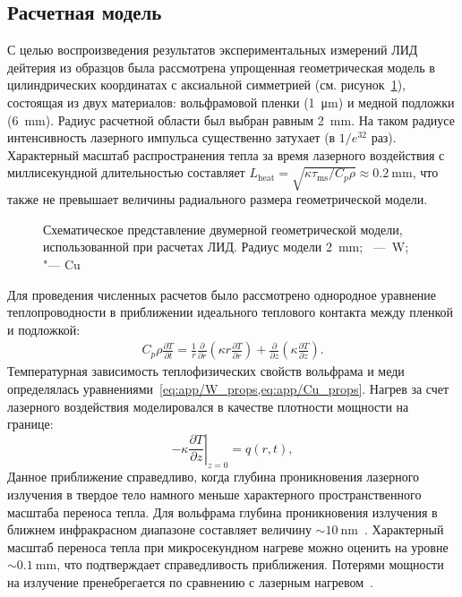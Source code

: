 \subsection{Расчетная модель}\label{subsec:ch4/sec1/subsec3}

С целью воспроизведения результатов экспериментальных измерений ЛИД дейтерия из образцов была рассмотрена упрощенная геометрическая модель в цилиндрических координатах с аксиальной симметрией (см. рисунок~\cref{fig:ch4/LID_geom}), состоящая из двух материалов: вольфрамовой пленки (\SI{1}{\micro\meter}) и медной подложки (\SI{6}{\milli\meter}). Радиус расчетной области был выбран равным \SI{2}{\milli\meter}. На таком радиусе интенсивность лазерного импульса существенно затухает (в \( 1/e^{32} \) раз). Характерный масштаб распространения тепла за время лазерного воздействия с миллисекундной длительностью составляет \( L_\mathrm{heat}=\sqrt{\kappa \tau_\mathrm{ms}/C_p \rho} \approx \SI{0.2}{\milli\meter} \), что также не превышает величины радиального размера геометрической модели.

\begin{figure}[ht]
    \caption{Схематическое представление двумерной геометрической модели, использованной при расчетах ЛИД. Радиус модели \SI{2}{\milli\meter}; \cruleme[customgrey]{0.5cm}{0.5cm}~---~W; \cruleme[customorange]{0.5cm}{0.5cm} "--- Cu}\label{fig:ch4/LID_geom}
\end{figure}

Для проведения численных расчетов было рассмотрено однородное уравнение теплопроводности в приближении идеального теплового контакта между пленкой и подложкой:
\begin{align}
    C_p \rho \frac{\partial T}{\partial t} = \frac{1}{r}\frac{\partial}{\partial r}\left( \kappa r \frac{\partial T}{\partial r} \right) + \frac{\partial }{\partial z}\left( \kappa \frac{\partial T}{\partial z} \right).
\end{align}
Температурная зависимость теплофизических свойств вольфрама и меди определялась уравнениями~\cref{eq:app/W_props,eq:app/Cu_props}. Нагрев за счет лазерного воздействия моделировался в качестве плотности мощности на границе:
\begin{equation}
    -\kappa \left. \frac{\partial T}{\partial z} \right\vert_{z=0} = q(r, t),
\end{equation}
Данное приближение справедливо, когда глубина проникновения лазерного излучения в твердое тело намного меньше характерного пространственного масштаба переноса тепла. Для вольфрама глубина проникновения излучения в ближнем инфракрасном диапазоне составляет величину \( \sim \SI{10}{\nano\meter} \)~\cite{Ordal1988}. Характерный масштаб переноса тепла при микросекундном нагреве можно оценить на уровне \( \sim \SI{0.1}{\milli\meter} \), что подтверждает справедливость приближения. Потерями мощности на излучение пренебрегается по сравнению с лазерным нагревом~\cite{Stepanenko2024}.


